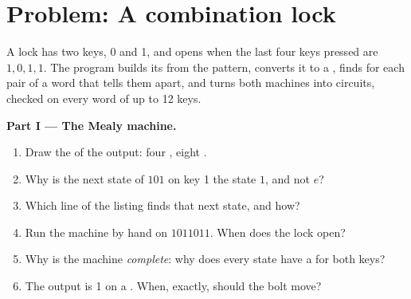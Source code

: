 \section{Problem: A combination lock}\label{sec:b1:sequential-circuits:problem}

\begin{problem}\label{pb:b1:sequential-circuits:1}
A lock has two keys, 0 and 1, and opens when the last four keys pressed are $1, 0, 1, 1$. The program builds its  from the pattern, converts it to a , finds for each pair of  a word that tells them apart,
and turns both machines into circuits, checked on every word of up to 12 keys.
\label{lst:b1:sequential-circuits:lock}
\label{out:b1:sequential-circuits:lock}

\medskip\noindent\textbf{Part I --- The Mealy machine.}
\begin{enumerate}
\item Draw the  of the output: four , eight .
\item Why is the next state of $101$ on key 1 the state $1$, and not $e$?
\item Which line of the listing finds that next state, and how?
\item Run the machine by hand on $1011011$. When does the lock open?
\item Why is the machine \emph{complete}: why does every state have a  for both keys?
\item The output is 1 on a . When, exactly, should the bolt move?
\end{enumerate}


\end{problem}
